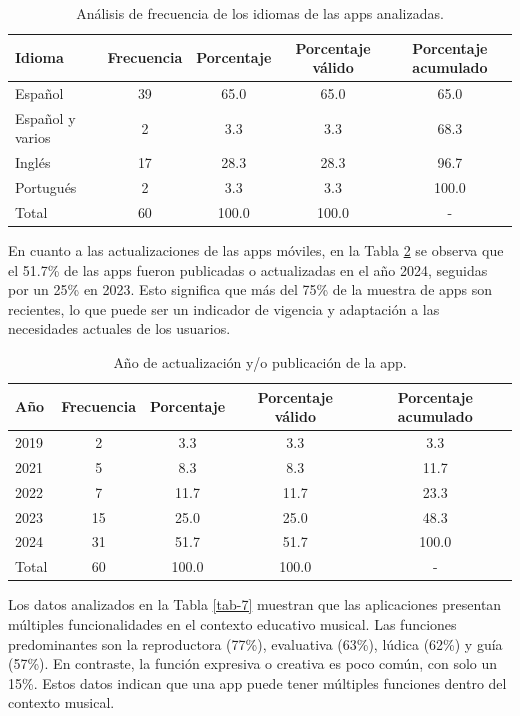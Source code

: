 \documentclass[spanish]{textolivre}
\begin{document}
\begin{table}[h!]
\centering
\begin{threeparttable}
\caption{Análisis de frecuencia de los idiomas de las apps analizadas.}\label{tab-5}
\begin{tabular}{lcccc}
\toprule
Idioma & Frecuencia & Porcentaje & Porcentaje válido & Porcentaje acumulado \\
\midrule
Español & 39 & 65.0 & 65.0 & 65.0 \\
Español y varios & 2 & 3.3 & 3.3 & 68.3 \\
Inglés & 17 & 28.3 & 28.3 & 96.7 \\
Portugués & 2 & 3.3 & 3.3 & 100.0 \\
Total & 60 & 100.0 & 100.0 & - \\
\bottomrule
\end{tabular}
\end{threeparttable}
\end{table}

En cuanto a las actualizaciones de las apps móviles, en la Tabla \ref{tab-6} se observa que el 51.7\% de las apps fueron publicadas o actualizadas en el año 2024, seguidas por un 25\% en 2023. Esto significa que más del 75\% de la muestra de apps son recientes, lo que puede ser un indicador de vigencia y adaptación a las necesidades actuales de los usuarios. 

\begin{table}[htbp]
\centering
\begin{threeparttable}
\caption{Año de actualización y/o publicación de la app.}\label{tab-6}
\begin{tabular}{lcccc}
\toprule
Año & Frecuencia & Porcentaje & Porcentaje válido & Porcentaje acumulado \\
\midrule
2019 & 2 & 3.3 & 3.3 & 3.3 \\
2021 & 5 & 8.3 & 8.3 & 11.7 \\
2022 & 7 & 11.7 & 11.7 & 23.3 \\
2023 & 15 & 25.0 & 25.0 & 48.3 \\
2024 & 31 & 51.7 & 51.7 & 100.0 \\
Total & 60 & 100.0 & 100.0 & - \\
\bottomrule
\end{tabular}
\end{threeparttable}
\end{table}

Los datos analizados en la Tabla \ref{tab-7} muestran que las aplicaciones presentan múltiples funcionalidades en el contexto educativo musical. Las funciones predominantes son la reproductora (77\%), evaluativa (63\%), lúdica (62\%) y guía (57\%). En contraste, la función expresiva o creativa es poco común, con solo un 15\%. Estos datos indican que una app puede tener múltiples funciones dentro del contexto musical.  
\end{document}

